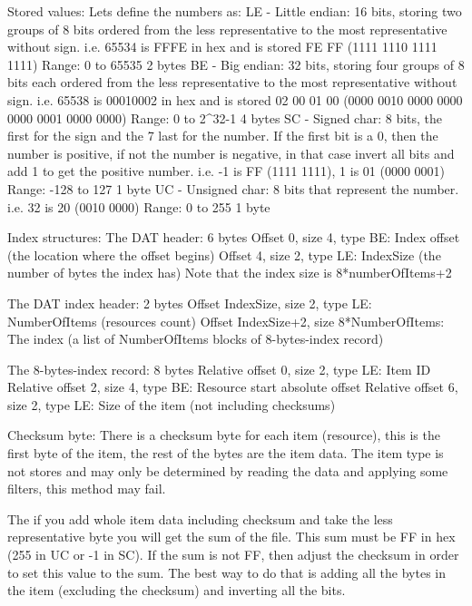  Stored values:
 Lets define the numbers as:
  LE - Little endian: 16 bits, storing two groups of 8 bits ordered from
       the less representative to the most representative without sign.
       i.e. 65534 is FFFE in hex and is stored FE FF (1111 1110 1111 1111)
       Range: 0 to 65535
       2 bytes
  BE - Big endian: 32 bits, storing four groups of 8 bits each ordered from
       the less representative to the most representative without sign.
       i.e. 65538 is 00010002 in hex and is stored 02 00 01 00
       (0000 0010 0000 0000 0000 0001 0000 0000)
       Range: 0 to 2^32-1
       4 bytes
  SC - Signed char: 8 bits, the first for the sign and the 7 last for the
       number. If the first bit is a 0, then the number is positive, if not
       the number is negative, in that case invert all bits and add 1 to
       get the positive number.
       i.e. -1 is FF (1111 1111), 1 is 01 (0000 0001)
       Range: -128 to 127
       1 byte
  UC - Unsigned char: 8 bits that represent the number.
       i.e. 32 is 20 (0010 0000)
       Range: 0 to 255
       1 byte

 Index structures:
 The DAT header: 6 bytes
  Offset 0, size 4, type BE: Index offset (the location where the offset
                             begins)
  Offset 4, size 2, type LE: IndexSize (the number of bytes the index has)
                             Note that the index size is 8*numberOfItems+2

 The DAT index header: 2 bytes
  Offset IndexSize, size 2, type LE: NumberOfItems (resources count)
  Offset IndexSize+2, size 8*NumberOfItems: The index (a list of
                              NumberOfItems blocks of 8-bytes-index record)

 The 8-bytes-index record: 8 bytes
  Relative offset 0, size 2, type LE: Item ID
  Relative offset 2, size 4, type BE: Resource start absolute offset
  Relative offset 6, size 2, type LE: Size of the item (not including
                                      checksums)

 Checksum byte:
 There is a checksum byte for each item (resource), this is the first byte
 of the item, the rest of the bytes are the item data. The item type is not
 stores and may only be determined by reading the data and applying some
 filters, this method may fail.

 The if you add whole item data including checksum and take the less
 representative byte you will get the sum of the file. This sum must be FF
 in hex (255 in UC or -1 in SC). If the sum is not FF, then adjust the
 checksum in order to set this value to the sum. The best way to do that is
 adding all the bytes in the item (excluding the checksum) and inverting
 all the bits.

